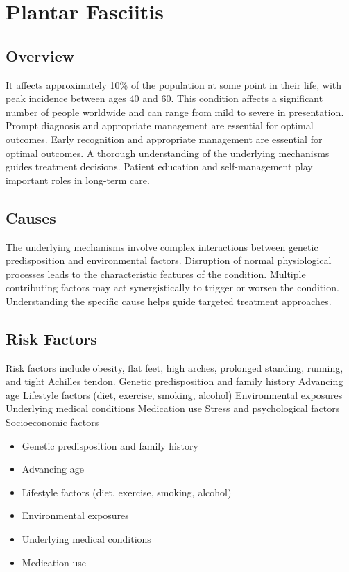 \chapter{Plantar Fasciitis}
\label{sec:Plantar Fasciitis}

\section{Overview}
It affects approximately 10\% of the population at some point in their life, with peak incidence between ages 40 and 60. This condition affects a significant number of people worldwide and can range from mild to severe in presentation. Prompt diagnosis and appropriate management are essential for optimal outcomes. Early recognition and appropriate management are essential for optimal outcomes. A thorough understanding of the underlying mechanisms guides treatment decisions. Patient education and self-management play important roles in long-term care.
\section{Causes}
The underlying mechanisms involve complex interactions between genetic predisposition and environmental factors. Disruption of normal physiological processes leads to the characteristic features of the condition. Multiple contributing factors may act synergistically to trigger or worsen the condition. Understanding the specific cause helps guide targeted treatment approaches.
\section{Risk Factors}
Risk factors include obesity, flat feet, high arches, prolonged standing, running, and tight Achilles tendon. Genetic predisposition and family history Advancing age Lifestyle factors (diet, exercise, smoking, alcohol) Environmental exposures Underlying medical conditions Medication use Stress and psychological factors Socioeconomic factors

\begin{itemize}[noitemsep]
  \item Genetic predisposition and family history
  \item Advancing age
  \item Lifestyle factors (diet, exercise, smoking, alcohol)
  \item Environmental exposures
  \item Underlying medical conditions
  \item Medication use
\end{itemize}
